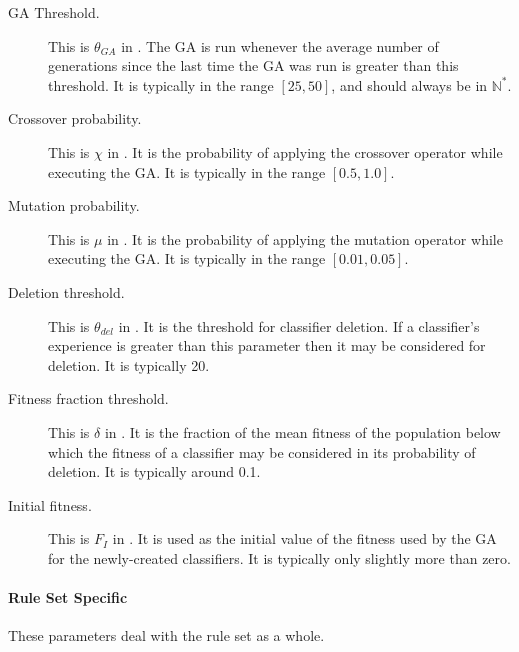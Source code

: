 \begin{description}
\item [GA Threshold.]
\label{sec:ga-threshold}
This is $\theta_{GA}$ in \cite{ButzWilson}.
The GA is run whenever the average number of generations since the last time the GA was run is greater than this threshold.
It is typically in the range $[25, 50]$, and should always be in $\mathbb{N^*}$.
\item [Crossover probability.]
\label{sec:crossover-probability}
This is $\chi$ in \cite{ButzWilson}.
It is the probability of applying the crossover operator while executing the GA.
It is typically  in the range $[0.5, 1.0]$.
\item [Mutation probability.]
\label{sec:mutation-probability}
This is $\mu$ in \cite{ButzWilson}.
It is the probability of applying the mutation operator while executing the GA.
It is typically in the range $[0.01, 0.05]$.
\item [Deletion threshold.]
This is $\theta_{del}$ in \cite{ButzWilson}.
It is the threshold for classifier deletion.
If a classifier's experience is greater than this parameter then it may be considered for deletion.
It is typically 20.
\item [Fitness fraction threshold.]
This is $\delta$ in \cite{ButzWilson}.
It is the fraction of the mean fitness of the population below which the fitness of a classifier may be considered in its probability of deletion.
It is typically around 0.1.
\item [Initial fitness.]
This is $F_I$ in \cite{ButzWilson}.
It is used as the initial value of the fitness used by the GA for the newly-created classifiers. 
It is typically only slightly more than zero.
\end{description}

\paragraph{Rule Set Specific}
These parameters deal with the rule set as a whole.


